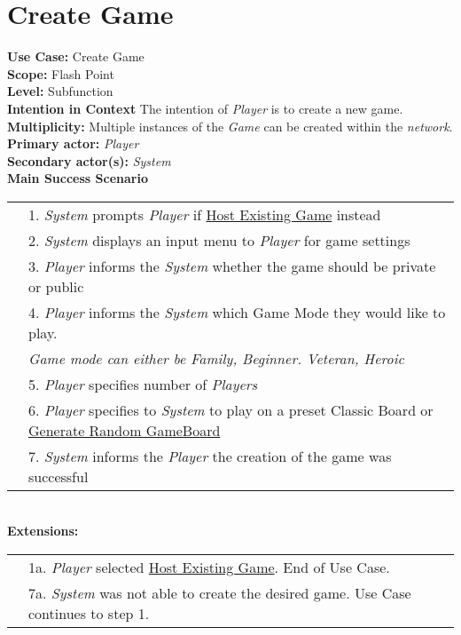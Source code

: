 \documentclass{article}
\begin{document}
	\section*{Create Game}
	\textbf{Use Case:} Create Game\\
	\textbf{Scope:}
	Flash Point\\
	\textbf{Level:}
	Subfunction\\
	\textbf{Intention in Context}
	The intention of \textit{Player} is to create a new game.\\
	\textbf{Multiplicity:}
	Multiple instances of the \textit{Game} can be created within the \textit{network}.\\
	\textbf{Primary actor: } \textit{Player}\\
	\textbf{Secondary actor(s):} \textit{System}\\
	\textbf{Main Success Scenario}\\
	\begin{tabular}{l l}
		&1. \textit{System} prompts \textit{Player} if \underline{Host Existing Game} instead\\
		&2. \textit{System} displays an input menu to \textit{Player} for game settings\\
		&3. \textit{Player} informs the \textit{System} whether the game should be private or public\\
		&4. \textit{Player} informs the \textit{System} which Game Mode they would like to play.\\
		&\qquad \textit{Game mode can either be Family, Beginner. Veteran, Heroic}\\
		&5. \textit{Player} specifies number of \textit{Players}\\
		&6. \textit{Player} specifies to \textit{System} to play on a preset Classic Board or \underline{Generate Random GameBoard}\\
		&7. \textit{System} informs the \textit{Player} the creation of the game was successful
	\end{tabular}\\
	\textbf{Extensions:}\\
	\begin{tabular}{l l}
		&1a. \textit{Player} selected \underline{Host Existing Game}. End of Use Case.\\
		&7a. \textit{System} was not able to create the desired game. Use Case continues to step 1.
	\end{tabular}
\end{document}

